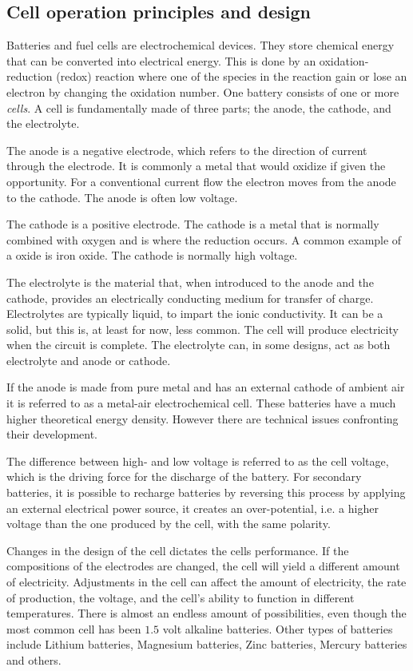 \subsection{Cell operation principles and design}
Batteries and fuel cells are electrochemical devices. They store chemical energy that can be converted into electrical energy. This is done by an oxidation-reduction (redox) reaction where one of the species in the reaction gain or lose an electron by changing the oxidation number.  One battery consists of one or more \textit{cells}. A cell is fundamentally made of three parts; the anode, the cathode, and the electrolyte.

The anode is a negative electrode, which refers to the direction of current through the electrode. It is commonly a metal that would oxidize if given the opportunity. For a conventional current flow the electron moves from the anode to the cathode. The anode is often low voltage.  

The cathode is a positive electrode. The cathode is a metal that is normally combined with oxygen and is where the reduction occurs. A common example of a oxide is iron oxide. The cathode is normally high voltage. 

The electrolyte is the material that, when introduced to the anode and the cathode, provides an electrically conducting medium for transfer of charge. Electrolytes are typically liquid, to impart the ionic conductivity. It can be a solid, but this is, at least for now, less common. The cell will produce electricity when the circuit is complete. The electrolyte can, in some designs, act as both electrolyte and anode or cathode. 

If the anode is made from pure metal and has an external cathode of ambient air it is referred to as a metal-air electrochemical cell. These batteries have a much higher theoretical energy density. However there are technical issues confronting their development. \cite{li2017metal}

The difference between high- and low voltage is referred to as the cell voltage, which is the driving force for the discharge of the battery. For secondary batteries, it is possible to recharge batteries by reversing this process by applying an external electrical power source, it creates an over-potential, i.e. a higher voltage than the one produced by the cell, with the same polarity. 

Changes in the design of the cell dictates the cells performance. If the compositions of the electrodes are changed, the cell will yield a different amount of electricity. Adjustments in the cell can affect the amount of electricity, the rate of production, the voltage, and the cell's ability to function in different temperatures. There is almost an endless amount of possibilities, even though the most common cell has been $1.5$ volt alkaline batteries. Other types of batteries include Lithium  batteries, Magnesium batteries, Zinc batteries,  Mercury batteries and others.

